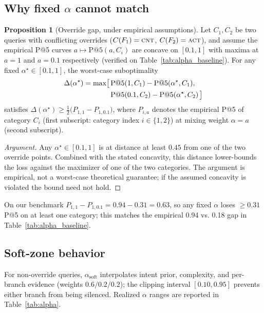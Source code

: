 ﻿\documentclass[conference]{IEEEtran}
\theoremstyle{definition}
\newtheorem{proposition}{Proposition}
\begin{document}
\subsection{Why fixed \texorpdfstring{$\alpha$}{alpha} cannot match}
\begin{proposition}[Override gap, under empirical assumptions]
\label{lem:mono}
Let $C_1,C_2$ be two queries with conflicting overrides ($C(F_1)=\textsc{cnt}$, $C(F_2)=\textsc{act}$), and assume the empirical P@5 curves $a\mapsto\mathrm{P@5}(a, C_i)$ are concave on $[0.1,1]$ with maxima at $a=1$ and $a=0.1$ respectively (verified on Table~\ref{tab:alpha_baseline}). For any fixed $\alpha^\star\in[0.1,1]$, the worst-case suboptimality
\begin{align}
\Delta(\alpha^\star) = \max\bigl[\,&\mathrm{P@5}(1, C_1) - \mathrm{P@5}(\alpha^\star, C_1),\notag\\
&\mathrm{P@5}(0.1, C_2) - \mathrm{P@5}(\alpha^\star, C_2)\,\bigr]
\end{align}
satisfies $\Delta(\alpha^\star)\ge \tfrac12\bigl(P_{1,1}-P_{1,0.1}\bigr)$, where $P_{i,a}$ denotes the empirical P@5 of category $C_i$ (first subscript: category index $i\in\{1,2\}$) at mixing weight $\alpha=a$ (second subscript).
\end{proposition}
\begin{proof}[Argument]
Any $\alpha^\star\in[0.1,1]$ is at distance at least $0.45$ from one of the two override points. Combined with the stated concavity, this distance lower-bounds the loss against the maximizer of one of the two categories. The argument is empirical, not a worst-case theoretical guarantee; if the assumed concavity is violated the bound need not hold.
\end{proof}
On our benchmark $P_{1,1}-P_{1,0.1}=0.94-0.31=0.63$, so any fixed $\alpha$ loses $\ge 0.31$ P@5 on at least one category; this matches the empirical 0.94 vs. 0.18 gap in Table~\ref{tab:alpha_baseline}.

\subsection{Soft-zone behavior}
For non-override queries, $\alpha_{\text{soft}}$ interpolates intent prior, complexity, and per-branch evidence (weights $0.6/0.2/0.2$); the clipping interval $[0.10, 0.95]$ prevents either branch from being silenced. Realized $\alpha$ ranges are reported in Table~\ref{tab:alpha}.
\end{document}
